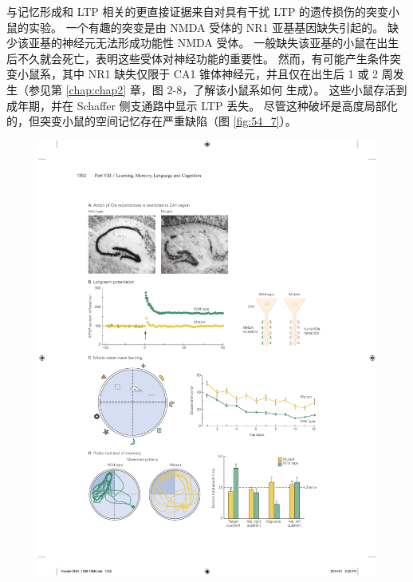 与记忆形成和 LTP 相关的更直接证据来自对具有干扰 LTP 的遗传损伤的突变小鼠的实验。 一个有趣的突变是由 NMDA 受体的 NR1 亚基基因缺失引起的。 缺少该亚基的神经元无法形成功能性 NMDA 受体。 一般缺失该亚基的小鼠在出生后不久就会死亡，表明这些受体对神经功能的重要性。 然而，有可能产生条件突变小鼠系，其中 NR1 缺失仅限于 CA1 锥体神经元，并且仅在出生后 1 或 2 周发生（参见第 \ref{chap:chap2} 章，图 2-8，了解该小鼠系如何 生成）。 这些小鼠存活到成年期，并在 Schaffer 侧支通路中显示 LTP 丢失。 尽管这种破坏是高度局部化的，但突变小鼠的空间记忆存在严重缺陷（图 \ref{fig:54_7}）。

\begin{figure}[htbp]
	\centering
	\includegraphics[width=0.9\linewidth]{chap54/fig_54_7}

\end{figure}
